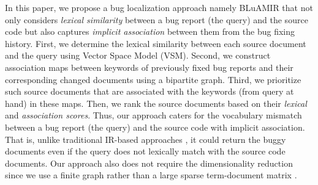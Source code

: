 \documentclass[conference]{IEEEtran}
\begin{document}
\begin{table}[!tb]
	\caption{An Example Bug Report (\#95167, eclipse.jdt.core)}
	\label{tab:BugInfo}
	\vspace{-.2cm}
	    \vspace{-.5cm}
\end{table}


In this paper, we propose a bug localization approach namely BLuAMIR that not only considers \emph{lexical similarity} between a bug report (the query) and the source code but also captures \emph{implicit association} between them from the bug fixing history. First, we determine the lexical similarity between each source document and the query using Vector Space Model (VSM).
Second, we construct association maps between keywords of previously fixed bug reports and their corresponding changed documents using a bipartite graph. Third, we prioritize such source documents that are associated with the keywords (from query at hand) in these maps. Then, we rank the source documents based on their \emph{lexical} and \emph{association scores}.
Thus, our approach caters for the vocabulary mismatch between a bug report (the query) and the source code with implicit association. 
That is, unlike traditional IR-based approaches \cite{Jian,Saha}, it could return the buggy documents even if the query does not lexically match with the source code documents. Our approach also does not require the dimensionality reduction since we use a finite graph rather than a large sparse term-document matrix \cite{MarcusLSI,MarcusMaletic}.
\end{document}
